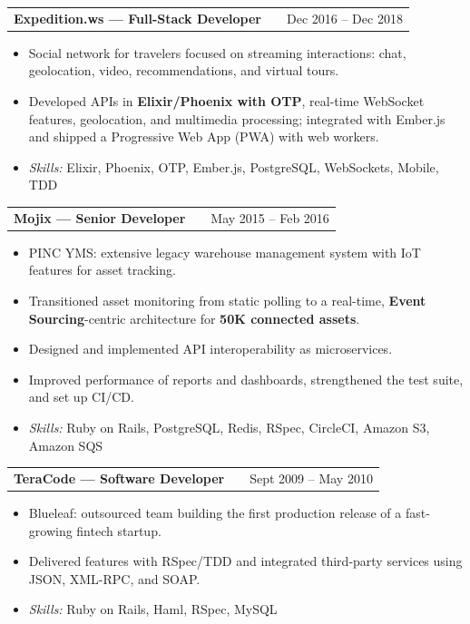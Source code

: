 \documentclass[a4paper,12pt]{article}
\makeatletter
\newcommand{\skillsfont}{\fontsize{9.6}{11.5}\selectfont}
\newenvironment{joblong}[2]
    {
    \begin{tabularx}{\linewidth}{@{}l X r@{}}
    \textbf{#1} & \hfill &  #2 \\[3.75pt]
    \end{tabularx}
    \begin{minipage}[t]{\linewidth}
    \begin{itemize}[nosep,after=\strut, leftmargin=1em, itemsep=3pt,label=--]
    }
    {
    \end{itemize}
    \end{minipage}
    }
\makeatother
\begin{document}
\begin{joblong}{Expedition.ws --- Full-Stack Developer}{Dec 2016 -- Dec 2018}
\item Social network for travelers focused on
      streaming interactions: chat, geolocation, video, recommendations, and
      virtual tours.
\item Developed APIs in \textbf{Elixir/Phoenix with OTP}, real-time WebSocket
      features, geolocation, and multimedia processing; integrated with Ember.js
      and shipped a Progressive Web App (PWA) with web workers.
\par\vspace{6pt}\item[]\skillsfont\textit{Skills:} Elixir, Phoenix, OTP, Ember.js, PostgreSQL, WebSockets, Mobile, TDD
\end{joblong}

\begin{joblong}{Mojix --- Senior Developer}{May 2015 -- Feb 2016}
\item PINC YMS: extensive legacy warehouse management system
      with IoT features for asset tracking.
\item Transitioned asset monitoring from static polling to a real-time,
      \textbf{Event Sourcing}-centric architecture for \textbf{50K connected assets}.
\item Designed and implemented API interoperability as microservices.
\item Improved performance of reports and dashboards, strengthened the test
      suite, and set up CI/CD.
\par\vspace{6pt}\item[]\skillsfont\textit{Skills:} Ruby on Rails, PostgreSQL, Redis, RSpec, CircleCI, Amazon S3, Amazon SQS
\end{joblong}

\begin{joblong}{TeraCode --- Software Developer}{Sept 2009 -- May 2010}
\item Blueleaf: outsourced team building the first
      production release of a fast-growing fintech startup.
\item Delivered features with RSpec/TDD and integrated third-party services
      using JSON, XML-RPC, and SOAP.
\par\vspace{6pt}\item[]\skillsfont\textit{Skills:} Ruby on Rails, Haml, RSpec, MySQL
\end{joblong}
\end{document}
